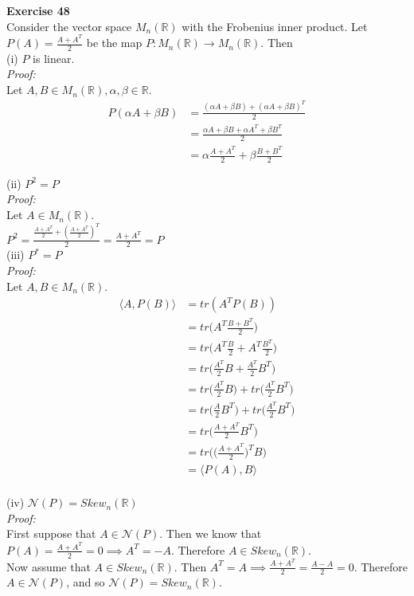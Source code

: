 \documentclass[letterpaper,12pt]{article}
\theoremstyle{definition}
\begin{document}
\textbf{Exercise 48} \\
Consider the vector space $M_n(\mathbb{R})$ with the Frobenius inner product. Let $P(A) = \frac{A+A^T}{2}$ be the map $P: M_n(\mathbb{R}) \rightarrow M_n(\mathbb{R})$. Then \\

(i) $P$ is linear. \\
\textit{Proof:} \\
Let $A, B \in M_n(\mathbb{R}), \alpha, \beta \in \mathbb{R}$. \\
\begin{align*}
  P(\alpha A + \beta B) &= \frac{(\alpha A + \beta B) + (\alpha A + \beta B)^T}{2} \\
  &= \frac{\alpha A + \beta B + \alpha A^T + \beta B^T}{2} \\
  &= \alpha \frac{A + A^T}{2} + \beta \frac{B + B^T}{2}
\end{align*}

(ii) $P^2 = P$ \\
\textit{Proof:} \\
Let $A \in M_n(\mathbb{R})$. \\
$P^2 = \frac{\frac{A+A^T}{2}+(\frac{A+A^T}{2})^T}{2} = \frac{A+A^T}{2} = P$ \\

(iii) $P^* = P$ \\
\textit{Proof:} \\
Let $A, B \in M_n(\mathbb{R})$. \\
\begin{align*}
  \langle A, P(B) \rangle &= tr(A^TP(B)) \\
  &= tr\Big(A^T\frac{B + B^T}{2}\Big) \\
  &= tr\Big(A^T\frac{B}{2} + A^T\frac{B^T}{2}\Big) \\
  &= tr\Big(\frac{A^T}{2}B + \frac{A^T}{2}B^T\Big) \\
  &= tr\Big(\frac{A^T}{2}B\Big) + tr(\frac{A^T}{2}B^T\Big) \\
  &= tr\Big(\frac{A}{2}B^T\Big) + tr(\frac{A^T}{2}B^T\Big) \\
  &= tr\Big(\frac{A + A^T}{2}B^T\Big) \\
  &= tr\Big(\Big(\frac{A + A^T}{2}\Big)^TB) \\
  &= \langle P(A), B \rangle\\
\end{align*}

(iv) $\mathscr{N}(P) = Skew_n(\mathbb{R})$ \\
\textit{Proof:} \\
First suppose that $A \in \mathscr{N}(P)$. Then we know that \\
$P(A) = \frac{A + A^T}{2} = 0 \implies A^T = -A$. Therefore $A \in Skew_n(\mathbb{R})$. \\
Now assume that $A \in Skew_n(\mathbb{R})$. Then $A^T = A \implies \frac{A + A^T}{2} = \frac{A - A}{2} = 0$. Therefore $A \in \mathscr{N}(P)$, and so $\mathscr{N}(P) = Skew_n(\mathbb{R})$. \\
\end{document}

